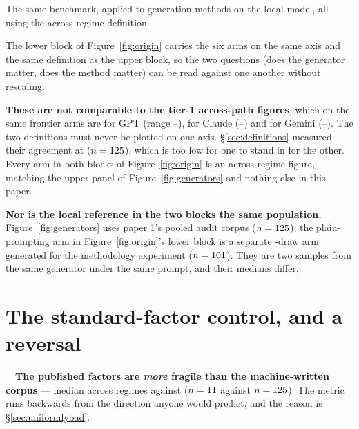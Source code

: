\documentclass[11pt,a4paper]{article}
\begin{document}
The same benchmark, applied to \pgmParadigmArms{} generation methods on the local model, all using
the across-regime definition.

The lower block of Figure~\ref{fig:origin} carries the six arms on the same axis and the same
definition as the upper block, so the two questions (does the generator matter, does the method
matter) can be read against one another without rescaling.



\begin{scopebox}
\textbf{These are not comparable to the tier-1 across-path figures}, which on the same frontier
arms are \rsGvGptFragMedian{} for GPT (range \rsGvGptFragMin{}--\rsGvGptFragMax{}),
\rsGvClaudeFragMedian{} for Claude (\rsGvClaudeFragMin{}--\rsGvClaudeFragMax{}) and
\rsGvGeminiFragMedian{} for Gemini (\rsGvGeminiFragMin{}--\rsGvGeminiFragMax{}). The two
definitions must never be plotted on one axis. \S\ref{sec:definitions} measured their agreement at
\rsDefinitionAgreement{} ($n=125{}$), which is too low for one to stand in for the
other. Every arm in both blocks of Figure~\ref{fig:origin} is an across-regime figure, matching the
upper panel of Figure~\ref{fig:generators} and nothing else in this paper.

\textbf{Nor is the local reference in the two blocks the same population.}
Figure~\ref{fig:generators} uses paper 1's pooled audit corpus ($n=125{}$);
the plain-prompting arm in Figure~\ref{fig:origin}'s lower block is a separate
\pgmPlainDraws{}-draw arm generated for the methodology experiment ($n=101{}$). They are
two samples from the same generator under the same prompt, and their medians differ.
\end{scopebox}

\section{The standard-factor control, and a reversal}
\label{sec:factors}

\begin{finding}
\tagexpl\ \ \textbf{The published factors are \emph{more} fragile than the machine-written corpus}
--- median \sfMedFrag{} across regimes against \rsGvLocalRegimeMedian{}
($n=11{}$ against $n=125{}$). The metric runs backwards from the direction anyone
would predict, and the reason is \S\ref{sec:uniformlybad}.
\end{finding}
\end{document}
